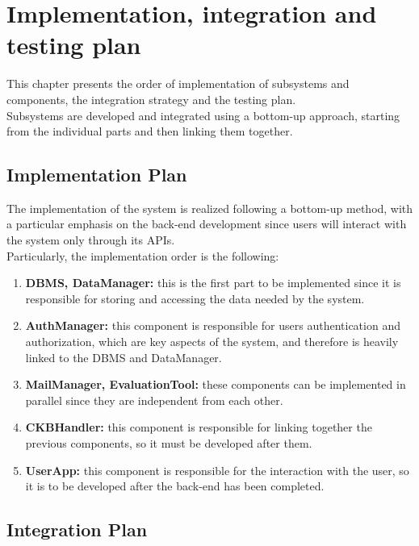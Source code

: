\chapter{Implementation, integration and testing plan}
This chapter presents the order of implementation of subsystems and components, 
the integration strategy and the testing plan.\\
Subsystems are developed and integrated using a bottom-up approach, starting from the 
individual parts and then linking them together.\\

\section{Implementation Plan}
The implementation of the system is realized following a bottom-up method, with a particular 
emphasis on the back-end development since users will interact with the system only through 
its APIs.\\
Particularly, the implementation order is the following:
\begin{enumerate}
    \item \textbf{DBMS, DataManager:} this is the first part to be implemented since it is responsible 
    for storing and accessing the data needed by the system.
    \item \textbf{AuthManager:} this component is responsible for users authentication and authorization, 
    which are key aspects of the system, and therefore is heavily linked to the DBMS and DataManager.
    \item \textbf{MailManager, EvaluationTool:} these components can be implemented in parallel since they are 
    independent from each other.
    \item \textbf{CKBHandler:} this component is responsible for linking together the previous components, so 
    it must be developed after them.
    \item \textbf{UserApp:} this component is responsible for the interaction with the user, so it is to be 
    developed after the back-end has been completed.
\end{enumerate}
\section{Integration Plan}

